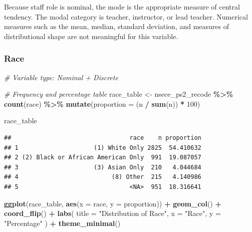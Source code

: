 \documentclass[
]{article}
\newenvironment{Shaded}{\begin{snugshade}}{\end{snugshade}}
\newcommand{\AttributeTok}[1]{\textcolor[rgb]{0.13,0.29,0.53}{#1}}
\newcommand{\CommentTok}[1]{\textcolor[rgb]{0.56,0.35,0.01}{\textit{#1}}}
\newcommand{\DecValTok}[1]{\textcolor[rgb]{0.00,0.00,0.81}{#1}}
\newcommand{\FunctionTok}[1]{\textcolor[rgb]{0.13,0.29,0.53}{\textbf{#1}}}
\newcommand{\NormalTok}[1]{#1}
\newcommand{\OtherTok}[1]{\textcolor[rgb]{0.56,0.35,0.01}{#1}}
\newcommand{\SpecialCharTok}[1]{\textcolor[rgb]{0.81,0.36,0.00}{\textbf{#1}}}
\newcommand{\StringTok}[1]{\textcolor[rgb]{0.31,0.60,0.02}{#1}}
\begin{document}
Because staff role is nominal, the mode is the appropriate measure of
central tendency. The modal category is teacher, instructor, or lead
teacher. Numerical measures such as the mean, median, standard
deviation, and measures of distributional shape are not meaningful for
this variable.

\newpage

\subsubsection{Race}\label{race}

\begin{Shaded}
\begin{Highlighting}[]
\CommentTok{\# Variable type: Nominal + Discrete}

\CommentTok{\# Frequency and percentage table}
\NormalTok{race\_table }\OtherTok{\textless{}{-}}
\NormalTok{  nsece\_ps2\_recode }\SpecialCharTok{\%\textgreater{}\%}
  \FunctionTok{count}\NormalTok{(race) }\SpecialCharTok{\%\textgreater{}\%}
  \FunctionTok{mutate}\NormalTok{(}\AttributeTok{proportion =}\NormalTok{ (n }\SpecialCharTok{/} \FunctionTok{sum}\NormalTok{(n)) }\SpecialCharTok{*} \DecValTok{100}\NormalTok{)}

\NormalTok{race\_table}
\end{Highlighting}
\end{Shaded}

\begin{verbatim}
##                                 race    n proportion
## 1                     (1) White Only 2825  54.410632
## 2 (2) Black or African American Only  991  19.087057
## 3                     (3) Asian Only  210   4.044684
## 4                          (8) Other  215   4.140986
## 5                               <NA>  951  18.316641
\end{verbatim}

\begin{Shaded}
\begin{Highlighting}[]
\FunctionTok{ggplot}\NormalTok{(race\_table,}
       \FunctionTok{aes}\NormalTok{(}\AttributeTok{x =}\NormalTok{ race, }\AttributeTok{y =}\NormalTok{ proportion)) }\SpecialCharTok{+}
  \FunctionTok{geom\_col}\NormalTok{() }\SpecialCharTok{+}
  \FunctionTok{coord\_flip}\NormalTok{() }\SpecialCharTok{+}
  \FunctionTok{labs}\NormalTok{(}
    \AttributeTok{title =} \StringTok{"Distribution of Race"}\NormalTok{,}
    \AttributeTok{x =} \StringTok{"Race"}\NormalTok{,}
    \AttributeTok{y =} \StringTok{"Percentage"}
\NormalTok{  ) }\SpecialCharTok{+}
  \FunctionTok{theme\_minimal}\NormalTok{()}
\end{Highlighting}
\end{Shaded}
\end{document}
